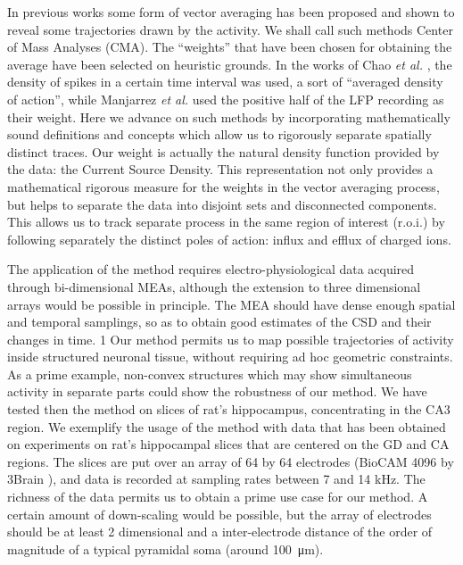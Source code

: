 \documentclass[11pt, letterpaper]{article}
\newcommand{\mum}[1]{\SI{#1}{\micro\metre}}
\begin{document}
In previous works some form of vector averaging has been proposed and shown to reveal some trajectories drawn by the activity. We shall call such methods Center of Mass Analyses (CMA).  The ``weights'' that have been chosen for obtaining the average have been selected on heuristic grounds. In the works of Chao \emph{et al.} \cite{Chao05, Chao07}, the density of spikes in a certain time interval was used, a sort of ``averaged density of action'', while Manjarrez \emph{et al.} \cite{Manjarrez07, Manjarrez09} used the positive half of the LFP recording as their weight. 
Here we advance on such methods by incorporating mathematically sound definitions and concepts which allow us to rigorously separate spatially distinct traces. Our weight is actually the natural density function provided by the data: the Current Source Density. This representation not only provides a mathematical rigorous  measure for the weights in the vector averaging process, but helps to separate the data into disjoint sets and disconnected components.
This allows us to track separate process in the same region of interest
(r.o.i.) by following separately the distinct poles of action: influx and
efflux of charged ions. 

The application of the method requires electro-physiological data acquired
through bi-dimensional MEAs, although the extension to three dimensional arrays would be possible in principle. The MEA should have dense enough spatial and temporal samplings, so as to obtain good estimates of the CSD and their changes in time.
1
Our method permits us to map possible trajectories of activity inside structured neuronal tissue, without requiring ad hoc geometric constraints. As a prime example, non-convex structures which may show simultaneous activity in separate parts could show the robustness of our method. We have tested then the method on slices of rat's hippocampus, concentrating in the CA3 region. We exemplify the usage of the method with data that has been obtained on experiments on rat's hippocampal slices that are centered on the GD and CA
regions. The slices are put over an array of 64 by 64 electrodes
(BioCAM 4096 by 3Brain \cite{BioCam}),
and data is recorded at sampling rates between 7 and 14 kHz. The richness of the
data permits us to obtain a prime use case for our method. A
 certain amount of down-scaling would be 
possible, but the array of electrodes should be at least 2 dimensional and
a inter-electrode distance of the order of magnitude of a typical pyramidal soma
(around \mum{100}). 
\end{document}
